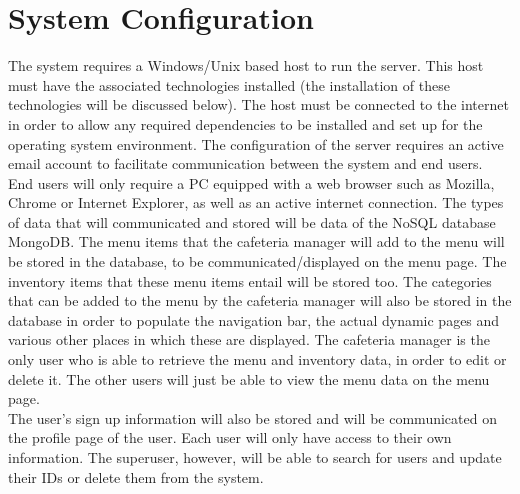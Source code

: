 \documentclass[a4paper,12pt]{report}
\begin{document}
\section{System Configuration}
The system requires a Windows/Unix based host to run the server. This host must have the associated technologies installed (the installation of these technologies will be discussed below). The host must be connected to the internet in order to allow any required dependencies to be installed and set up for the operating system environment. The configuration of the server requires an active email account to facilitate communication between the system and end users. 
End users will only require a PC equipped with a web browser such as Mozilla, Chrome or Internet Explorer, as well as an active internet connection.  
The types of data that will communicated and stored will be data of the NoSQL database MongoDB. The menu items that the cafeteria manager will add to the menu will be stored in the database, to be communicated/displayed on the menu page. The inventory items that these menu items entail will be stored too. The categories that can be added to the menu by the cafeteria manager will also be stored in the database in order to populate the navigation bar, the actual dynamic pages and various other places in which these are displayed. The cafeteria manager is the only user who is able to retrieve the menu and inventory data, in order to edit or delete it. The other users will just be able to view the menu data on the menu page. 
\\
The user's sign up information will also be stored and will be communicated on the profile page of the user. Each user will only have access to their own information. The superuser, however, will be able to search for users and update their IDs or delete them from the system.
\\
\end{document}
